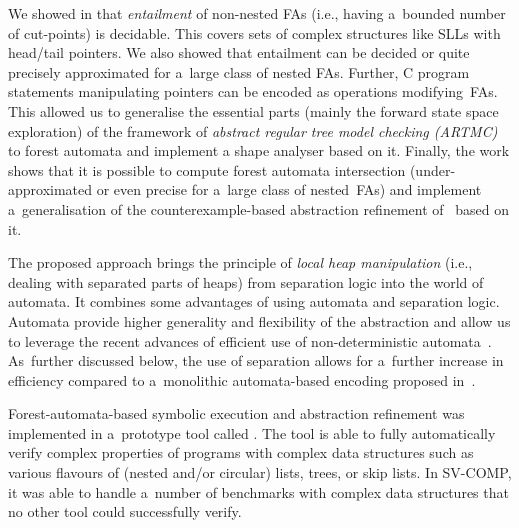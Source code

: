 We showed in \cite{habermehl:forest} that
\emph{entailment} of non-nested FAs
(i.e., having a~bounded number of cut-points) is decidable. This covers  sets of
complex structures like SLLs with head/tail pointers. 
We also showed that entailment can be decided or quite precisely approximated for a~large class
of nested FAs. 
Further, C program statements manipulating pointers can be encoded as operations
modifying~FAs. 
%
This allowed us to generalise the essential parts (mainly the forward state space exploration) of the framework of 
\emph{abstract regular tree model checking (ARTMC)} \cite{bhrv06a,bhrv06b} to forest automata and implement a shape analyser based on it. 
%
Finally, the work \cite{vmcai17} shows that it is possible to compute forest
automata intersection (under-approximated or even precise for a~large class
of nested~FAs) and implement a~generalisation of the
counterexample-based abstraction refinement of~\cite{bhrv06a,bhrv06b} based on it. 


The proposed approach brings the principle of \emph{local heap manipulation}
(i.e., dealing with separated parts of heaps) from separation logic into the
world of automata. It combines some advantages of using
automata and separation logic. Automata provide higher generality and
flexibility of the abstraction 
and allow us to leverage the
recent advances of efficient use of non-deterministic
automata~\cite{abdulla_computing_2008,tacas10}.
As~further discussed below, the use of
separation allows for a~further increase in efficiency compared to a~monolithic
automata-based encoding proposed in~\cite{bhrv06b}.

Forest-automata-based symbolic execution and abstraction refinement was implemented in a~prototype tool called \forester.
The tool is able to fully automatically verify complex properties of programs with complex data structures
such as various flavours of (nested and/or circular) lists, trees, or skip lists.
In SV-COMP, it was able to handle a~number of benchmarks with complex data
structures that no other tool could successfully verify. 


